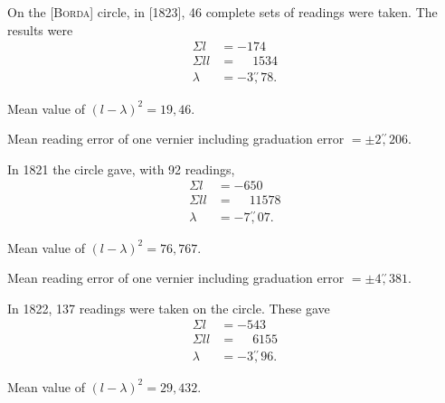 \par\bigskip
\par\noindent\hspace*{\parindent}On the [\textsc{Borda}] circle, in [1823], 46 complete sets of readings were taken. The results were
\[
\begin{aligned}
\Sigma l&=-174\\
\Sigma ll&=\phantom{-}1534\\
\lambda&=-3\overset{\prime\prime}{,}78.
\end{aligned}
\]
\par\noindent\hspace*{\parindent}Mean value of $(l-\lambda)^2=19{,}46$.
\par\noindent\hspace*{\parindent}Mean reading error of one vernier including graduation error $=\pm2\overset{\prime\prime}{,}206$.
\par\noindent\hspace*{\parindent}In 1821 the circle gave, with 92 readings,
\[
\begin{aligned}
\Sigma l&=-650\\
\Sigma ll&=\phantom{-}11578\\
\lambda&=-7\overset{\prime\prime}{,}07.
\end{aligned}
\]
\par\noindent\hspace*{\parindent}Mean value of $(l-\lambda)^2=76{,}767$.
\par\noindent\hspace*{\parindent}Mean reading error of one vernier including graduation error $=\pm4\overset{\prime\prime}{,}381$.
\par\noindent\hspace*{\parindent}In 1822, 137 readings were taken on the circle. These gave
\[
\begin{aligned}
\Sigma l&=-543\\
\Sigma ll&=\phantom{-}6155\\
\lambda&=-3\overset{\prime\prime}{,}96.
\end{aligned}
\]
\par\noindent\hspace*{\parindent}Mean value of $(l-\lambda)^2=29{,}432$.

